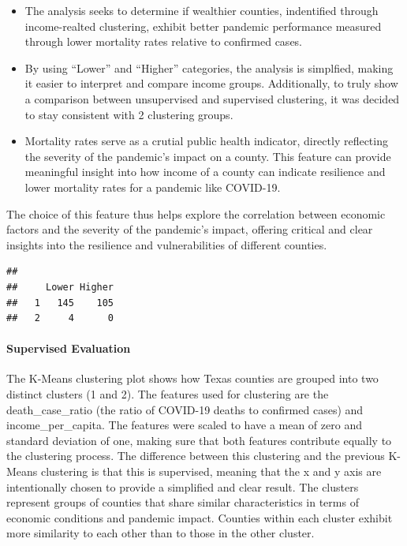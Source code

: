 \documentclass[
]{article}
\providecommand{\tightlist}{%
  \setlength{\itemsep}{0pt}\setlength{\parskip}{0pt}}
\begin{document}
\vspace{5pt}

\begin{itemize}
\tightlist
\item
  The analysis seeks to determine if wealthier counties, indentified
  through income-realted clustering, exhibit better pandemic performance
  measured through lower mortality rates relative to confirmed cases.
\item
  By using ``Lower'' and ``Higher'' categories, the analysis is
  simplfied, making it easier to interpret and compare income groups.
  Additionally, to truly show a comparison between unsupervised and
  supervised clustering, it was decided to stay consistent with 2
  clustering groups.
\item
  Mortality rates serve as a crutial public health indicator, directly
  reflecting the severity of the pandemic's impact on a county. This
  feature can provide meaningful insight into how income of a county can
  indicate resilience and lower mortality rates for a pandemic like
  COVID-19.
\end{itemize}

\vspace{5pt}

The choice of this feature thus helps explore the correlation between
economic factors and the severity of the pandemic's impact, offering
critical and clear insights into the resilience and vulnerabilities of
different counties.

\vspace{10pt}

\begin{verbatim}
##    
##     Lower Higher
##   1   145    105
##   2     4      0
\end{verbatim}


\vspace{10pt}

\paragraph{Supervised Evaluation}\label{supervised-evaluation}

The K-Means clustering plot shows how Texas counties are grouped into
two distinct clusters (1 and 2). The features used for clustering are
the death\_case\_ratio (the ratio of COVID-19 deaths to confirmed cases)
and income\_per\_capita. The features were scaled to have a mean of zero
and standard deviation of one, making sure that both features contribute
equally to the clustering process. The difference between this
clustering and the previous K-Means clustering is that this is
supervised, meaning that the x and y axis are intentionally chosen to
provide a simplified and clear result. The clusters represent groups of
counties that share similar characteristics in terms of economic
conditions and pandemic impact. Counties within each cluster exhibit
more similarity to each other than to those in the other cluster.
\end{document}
